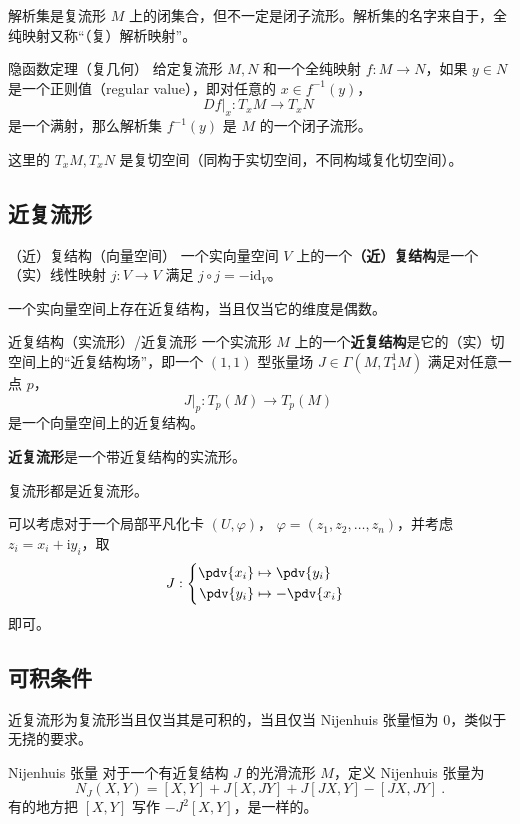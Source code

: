 解析集是复流形 $M$ 上的闭集合，但不一定是闭子流形。解析集的名字来自于，全纯映射又称“（复）解析映射”。

\begin{theorem}{隐函数定理（复几何）}
给定复流形 $M, N$ 和一个全纯映射 $f: M \to N$，如果 $y \in N$ 是一个正则值（regular value），即对任意的 $x \in f^{-1}(y)$，
$$
D f|_x: T_x M \to T_x N~
$$
是一个满射，那么解析集 $f^{-1}(y)$ 是 $M$ 的一个闭子流形。
\end{theorem}
这里的 $T_x M, T_x N$ 是复切空间（同构于实切空间，不同构域复化切空间）。


\subsection{近复流形}

\begin{definition}{（近）复结构（向量空间）}
一个实向量空间 $V$ 上的一个\textbf{（近）复结构}是一个（实）线性映射 $j: V \to V$ 满足 $j \circ j = - \text{id}_V$。
\end{definition}

\begin{theorem}{}
一个实向量空间上存在近复结构，当且仅当它的维度是偶数。
\end{theorem}

\begin{definition}{近复结构（实流形）/近复流形}
一个实流形 $M$ 上的一个\textbf{近复结构}是它的（实）切空间上的“近复结构场”，即一个 $(1, 1)$ 型张量场 $J \in \Gamma(M, T_1^1 M)$ 满足对任意一点 $p$， 
$$
J|_p: T_p(M) \to T_p(M)~
$$
是一个向量空间上的近复结构。

\textbf{近复流形}是一个带近复结构的实流形。
\end{definition}

\begin{theorem}{}
复流形都是近复流形。

可以考虑对于一个局部平凡化卡 $(U, \varphi)$， $\varphi = (z_1, z_2, \dots, z_n)$，并考虑 $z_i = x_i + \mathrm i y_i$，取 
\begin{equation}
J: \left\{\begin{aligned}
\pdv{x_i} &\mapsto \pdv{y_i} \\
\pdv{y_i} &\mapsto -\pdv{x_i} 
\end{aligned}\right. ~~
\end{equation}
即可。
\end{theorem}

\subsection{可积条件}
近复流形为复流形当且仅当其是可积的，当且仅当 Nijenhuis 张量恒为 $0$，类似于无挠的要求。
\begin{definition}{Nijenhuis 张量}
对于一个有近复结构 $J$ 的光滑流形 $M$，定义 Nijenhuis 张量为
\begin{equation}
N_J(X, Y) = [X, Y] + J[X, JY] + J[JX, Y] - [JX, JY] ~.
\end{equation}
有的地方把 $[X, Y]$ 写作 $-J^2[X, Y]$，是一样的。
\end{definition}


